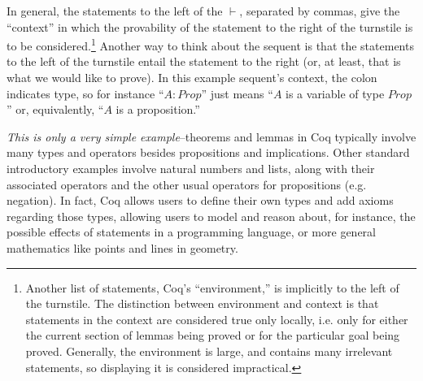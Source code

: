 \documentclass[11pt]{amsart}
\begin{document}
In general, the statements to the left of the $\vdash$, separated by commas, give the ``context'' in which the provability of the statement to the right of the turnstile is to be considered.\footnote{Another list of statements, Coq's ``environment,'' is implicitly to the left of the turnstile.  The distinction between environment and context is that statements in the context are considered true only locally, i.e. only for either the current section of lemmas being proved or for the particular goal being proved.  Generally, the environment is large, and contains many irrelevant statements, so displaying it is considered impractical.}  Another way to think about the sequent is that the statements to the left of the turnstile entail the statement to the right (or, at least, that is what we would like to prove).  In this example sequent's context, the colon indicates type, so for instance ``$A : Prop$'' just means ``$A$ is a variable of type $Prop$'' or, equivalently, ``$A$ is a proposition.''

\textit{This is only a very simple example}--theorems and lemmas in Coq typically involve many types and operators besides propositions and implications.  Other standard introductory examples involve natural numbers and lists, along with their associated operators and the other usual operators for propositions (e.g. negation).  In fact, Coq allows users to define their own types and add axioms regarding those types, allowing users to model and reason about, for instance, the possible effects of statements in a programming language, or more general mathematics like points and lines in geometry.
\end{document}
